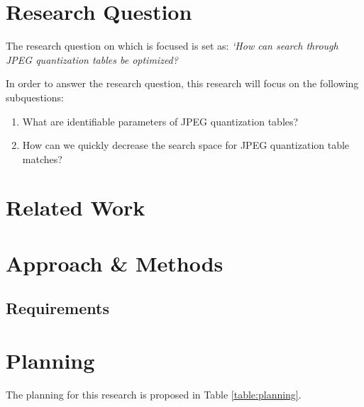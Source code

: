 \documentclass[a4paper,8pt]{article}
\begin{document}


\section*{Research Question}

The research question on which is focused is set as: \textit{`How can search through JPEG quantization tables be optimized?}

In order to answer the research question, this research will focus on the following subquestions:
\begin{enumerate}
\item What are identifiable parameters of JPEG quantization tables?
\item How can we quickly decrease the search space for JPEG quantization table matches?
\end{enumerate}

\section*{Related Work}




\section*{Approach \& Methods}

\subsection*{Requirements}

\section*{Planning}
The planning for this research is proposed in Table \ref{table:planning}.
\end{document}
